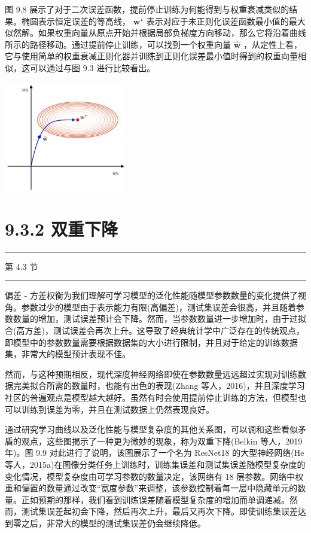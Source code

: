 \documentclass[10pt]{report}
\newcommand{\HRule}{\begin{center}\rule{0.9\linewidth}{0.2mm}\end{center}}
\begin{document}
图 9.8 展示了对于二次误差函数，提前停止训练为何能得到与权重衰减类似的结果。椭圆表示恒定误差的等高线， \({\mathbf{w}}^{ \star  }\) 表示对应于未正则化误差函数最小值的最大似然解。如果权重向量从原点开始并根据局部负梯度方向移动，那么它将沿着曲线所示的路径移动。通过提前停止训练，可以找到一个权重向量 \(\widehat{\mathbf{w}}\) ，从定性上看，它与使用简单的权重衰减正则化器并训练到正则化误差最小值时得到的权重向量相似，这可以通过与图 9.3 进行比较看出。

\begin{center}
\includegraphics[max width=0.4\textwidth]{images/0194e279-9b28-703a-88f4-c3ac21e2010d_287_944_349_607_546_0.jpg}
\end{center}
\hspace*{3em} 

\section*{9.3.2 双重下降}

\HRule

第 4.3 节

\HRule

偏差 - 方差权衡为我们理解可学习模型的泛化性能随模型参数数量的变化提供了视角。参数过少的模型由于表示能力有限(高偏差)，测试集误差会很高，并且随着参数数量的增加，测试误差预计会下降。然而，当参数数量进一步增加时，由于过拟合(高方差)，测试误差会再次上升。这导致了经典统计学中广泛存在的传统观点，即模型中的参数数量需要根据数据集的大小进行限制，并且对于给定的训练数据集，非常大的模型预计表现不佳。

然而，与这种预期相反，现代深度神经网络即使在参数数量远远超过实现对训练数据完美拟合所需的数量时，也能有出色的表现(Zhang 等人，2016)，并且深度学习社区的普遍观点是模型越大越好。虽然有时会使用提前停止训练的方法，但模型也可以训练到误差为零，并且在测试数据上仍然表现良好。

通过研究学习曲线以及泛化性能与模型复杂度的其他关系图，可以调和这些看似矛盾的观点，这些图揭示了一种更为微妙的现象，称为双重下降(Belkin 等人，2019 年)。图 9.9 对此进行了说明，该图展示了一个名为 ResNet18 的大型神经网络(He 等人，2015a)在图像分类任务上训练时，训练集误差和测试集误差随模型复杂度的变化情况，模型复杂度由可学习参数的数量决定，该网络有 18 层参数。网络中权重和偏置的数量通过改变“宽度参数”来调整，该参数控制着每一层中隐藏单元的数量。正如预期的那样，我们看到训练误差随着模型复杂度的增加而单调递减。然而，测试集误差起初会下降，然后再次上升，最后又再次下降。即使训练集误差达到零之后，非常大的模型的测试集误差仍会继续降低。
\end{document}
